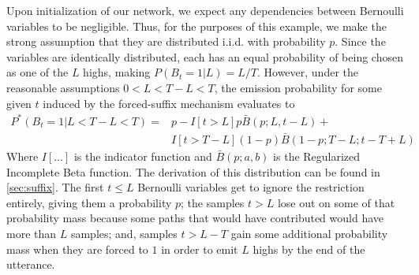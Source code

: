 \documentclass{article}
\begin{document}
Upon initialization of our network, we expect any dependencies between
Bernoulli variables to be negligible. Thus, for the purposes of this example,
we make the strong assumption that they are distributed i.i.d. with probability
$p$. Since the variables are identically distributed, each has an equal
probability of being chosen as one of the $L$ highs, making $P(B_t=1|L) = L /
T$. However, under the reasonable assumptions $0 < L < T - L < T$, the emission
probability for some given $t$ induced by the forced-suffix mechanism evaluates
to
%
\begin{equation} \label{eq:iid_suffix_dist}
    \begin{split}
        P^*(B_t=1|L < T - L < T)
        =& p - I[t > L]p\bar{B}(p; L, t - L) + \\
        &  I[t > T - L](1 - p)\bar{B}(1 - p; T - L; t - T + L)
    \end{split}
\end{equation}
%
Where $I[\ldots]$ is the indicator function and $\bar{B}(p; a, b)$ is the
Regularized Incomplete Beta function. The derivation of this distribution can
be found in \cref{sec:suffix}. The first $t \leq L$ Bernoulli variables
get to ignore the restriction entirely, giving them a probability $p$; the
samples $t > L$ lose out on some of that probability mass because some paths
that would have contributed would have more than $L$ samples; and, samples
$t > L - T$ gain some additional probability mass when they are forced to $1$
in order to emit $L$ highs by the end of the utterance.
\end{document}
